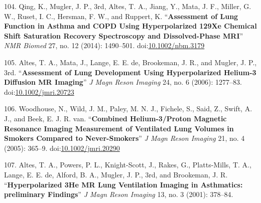 \documentclass[11pt,]{article}
\begin{document}
104. Qing, K., Mugler, J. P., 3rd, Altes, T. A., Jiang, Y., Mata, J. F.,
Miller, G. W., Ruset, I. C., Hersman, F. W., and Ruppert, K.
``\textbf{Assessment of Lung Function in Asthma and COPD Using
Hyperpolarized 129Xe Chemical Shift Saturation Recovery Spectroscopy and
Dissolved-Phase MRI}'' \emph{NMR Biomed} 27, no. 12 (2014): 1490--501.
doi:\href{http://dx.doi.org/10.1002/nbm.3179}{10.1002/nbm.3179}

105. Altes, T. A., Mata, J., Lange, E. E. de, Brookeman, J. R., and
Mugler, J. P., 3rd. ``\textbf{Assessment of Lung Development Using
Hyperpolarized Helium-3 Diffusion MR Imaging}'' \emph{J Magn Reson
Imaging} 24, no. 6 (2006): 1277--83.
doi:\href{http://dx.doi.org/10.1002/jmri.20723}{10.1002/jmri.20723}

106. Woodhouse, N., Wild, J. M., Paley, M. N. J., Fichele, S., Said, Z.,
Swift, A. J., and Beek, E. J. R. van. ``\textbf{Combined Helium-3/Proton
Magnetic Resonance Imaging Measurement of Ventilated Lung Volumes in
Smokers Compared to Never-Smokers}'' \emph{J Magn Reson Imaging} 21, no.
4 (2005): 365--9.
doi:\href{http://dx.doi.org/10.1002/jmri.20290}{10.1002/jmri.20290}

107. Altes, T. A., Powers, P. L., Knight-Scott, J., Rakes, G.,
Platts-Mills, T. A., Lange, E. E. de, Alford, B. A., Mugler, J. P., 3rd,
and Brookeman, J. R. ``\textbf{Hyperpolarized 3He MR Lung Ventilation
Imaging in Asthmatics: preliminary Findings}'' \emph{J Magn Reson
Imaging} 13, no. 3 (2001): 378--84.
\end{document}
